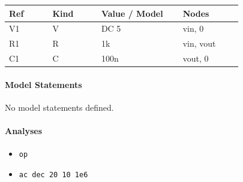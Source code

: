 \begin{longtable}{p{0.16\linewidth}p{0.18\linewidth}p{0.30\linewidth}p{0.22\linewidth}}
\textbf{Ref} & \textbf{Kind} & \textbf{Value / Model} & \textbf{Nodes}\\
\hline
V1 & V & DC 5 & vin, 0\\
R1 & R & 1k & vin, vout\\
C1 & C & 100n & vout, 0\\
\end{longtable}

\paragraph{Model Statements}
No model statements defined.

\paragraph{Analyses}
\begin{itemize}
  \item \texttt{op}
  \item \texttt{ac dec 20 10 1e6}
\end{itemize}
